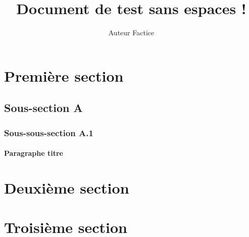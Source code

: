 \documentclass[10pt]{article}
\begin{document}
\title{Document de test sans espaces !}
\author{Auteur Factice}
\date{}
\maketitle

\section{Première section}
\lipsum[1]

\subsection{Sous-section A}
\lipsum[2]

\subsubsection{Sous-sous-section A.1}
\lipsum[3]

\paragraph{Paragraphe titre}
\lipsum[4]

\section{Deuxième section}
\lipsum[5-6]

\section{Troisième section}
\lipsum[7]
\end{document}
